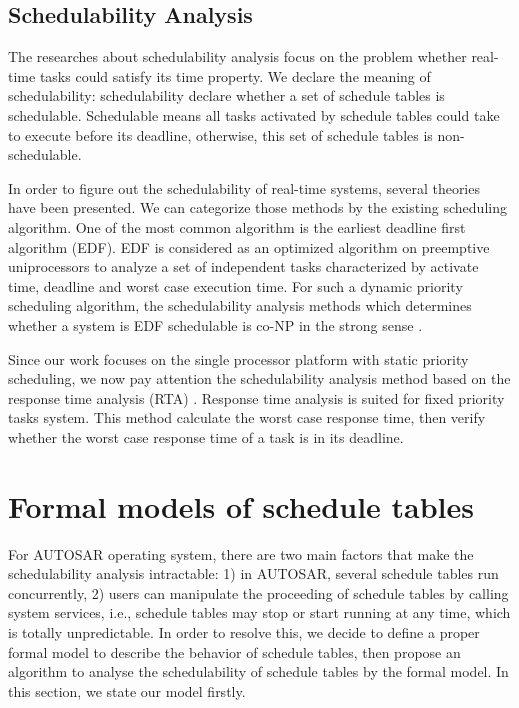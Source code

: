 \documentclass[sigconf]{acmart}
\begin{document}
\subsection{Schedulability Analysis}
The researches about schedulability analysis focus on the problem whether real-time tasks could satisfy its time property. We declare the meaning of schedulability: schedulability declare whether a set of schedule tables is schedulable. Schedulable means all tasks activated by schedule tables could take to execute before its deadline, otherwise, this set of schedule tables is non-schedulable.

In order to figure out the schedulability of real-time systems, several theories have been presented. We can categorize those methods by the existing scheduling algorithm. One of the most common algorithm is the earliest deadline first algorithm (EDF). EDF is considered as an optimized algorithm on preemptive uniprocessors to analyze a set of independent tasks characterized by activate time, deadline and worst case execution time. For such a dynamic priority scheduling algorithm, the schedulability analysis methods which determines whether a system is EDF schedulable is co-NP in the strong sense \cite{Goossens:1999:LWC:553897}.

Since our work focuses on the single processor platform with static priority scheduling, we now pay attention the schedulability analysis method based on the response time analysis (RTA) \cite{DBLP:journals/iee/AudsleyBRTW93}. Response time analysis is suited for fixed priority tasks system. This method calculate the worst case response time, then verify whether the worst case response time of a task is in its deadline. 

\section{Formal models of schedule tables} 
For AUTOSAR operating system, there are two main factors that make the schedulability analysis intractable: 1) in AUTOSAR, several schedule tables run concurrently, 2) users can manipulate the proceeding of schedule tables by calling system services, i.e., schedule tables may stop or start running at any time, which is totally unpredictable. In order to resolve this, we decide to define a proper formal model to describe the behavior of schedule tables, then propose an algorithm to analyse the schedulability of schedule tables by the formal model. In this section, we state our model firstly. 
\end{document}
